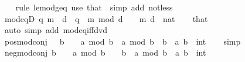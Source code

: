 \begin{isabellebody}
%
\isadelimproof
\ \ %
\endisadelimproof
%
\isatagproof
{}\isamarkupfalse%
\ {\isacharparenleft}{\kern0pt}rule\ le{\isacharunderscore}{\kern0pt}mod{\isacharunderscore}{\kern0pt}geq{\isacharparenright}{\kern0pt}\ {\isacharparenleft}{\kern0pt}use\ that\ \ {\isacartoucheopen}simp\ add{\isacharcolon}{\kern0pt}\ not{\isacharunderscore}{\kern0pt}less{\isacartoucheclose}{\isacharparenright}{\kern0pt}%
\endisatagproof
{\isafoldproof}%
%
\isadelimproof
\isanewline
%
\endisadelimproof
\isanewline
{}\isamarkupfalse%
\ mod{\isacharunderscore}{\kern0pt}eq{\isacharunderscore}{\kern0pt}{}D{\isacharcolon}{\kern0pt}\ {\isachardoublequoteopen}{\isasymexists}q{\isachardot}{\kern0pt}\ m\ {\isacharequal}{\kern0pt}\ d\ {\isacharasterisk}{\kern0pt}\ q{\isachardoublequoteclose}\ \ {\isachardoublequoteopen}m\ mod\ d\ {\isacharequal}{\kern0pt}\ {}{\isachardoublequoteclose}\ \ m\ d\ {\isacharcolon}{\kern0pt}{\isacharcolon}{\kern0pt}\ nat\isanewline
%
\isadelimproof
\ \ %
\endisadelimproof
%
\isatagproof
{}\isamarkupfalse%
\ that\ \isamarkupfalse%
\ {\isacharparenleft}{\kern0pt}auto\ simp\ add{\isacharcolon}{\kern0pt}\ mod{\isacharunderscore}{\kern0pt}eq{\isacharunderscore}{\kern0pt}{}{\isacharunderscore}{\kern0pt}iff{\isacharunderscore}{\kern0pt}dvd{\isacharparenright}{\kern0pt}%
\endisatagproof
{\isafoldproof}%
%
\isadelimproof
\isanewline
%
\endisadelimproof
\isanewline
{}\isamarkupfalse%
\ pos{\isacharunderscore}{\kern0pt}mod{\isacharunderscore}{\kern0pt}conj{\isacharcolon}{\kern0pt}\ {\isachardoublequoteopen}{}\ {\isacharless}{\kern0pt}\ b\ {\isasymLongrightarrow}\ {}\ {\isasymle}\ a\ mod\ b\ {\isasymand}\ a\ mod\ b\ {\isacharless}{\kern0pt}\ b{\isachardoublequoteclose}\ \ a\ b\ {\isacharcolon}{\kern0pt}{\isacharcolon}{\kern0pt}\ int\isanewline
%
\isadelimproof
\ \ %
\endisadelimproof
%
\isatagproof
{}\isamarkupfalse%
\ simp%
\endisatagproof
{\isafoldproof}%
%
\isadelimproof
\isanewline
%
\endisadelimproof
\isanewline
{}\isamarkupfalse%
\ neg{\isacharunderscore}{\kern0pt}mod{\isacharunderscore}{\kern0pt}conj{\isacharcolon}{\kern0pt}\ {\isachardoublequoteopen}b\ {\isacharless}{\kern0pt}\ {}\ {\isasymLongrightarrow}\ a\ mod\ b\ {\isasymle}\ {}\ {\isasymand}\ b\ {\isacharless}{\kern0pt}\ a\ mod\ b{\isachardoublequoteclose}\ \ a\ b\ {\isacharcolon}{\kern0pt}{\isacharcolon}{\kern0pt}\ int\isanewline
%
\isadelimproof
\ \ %

\end{isabellebody}
